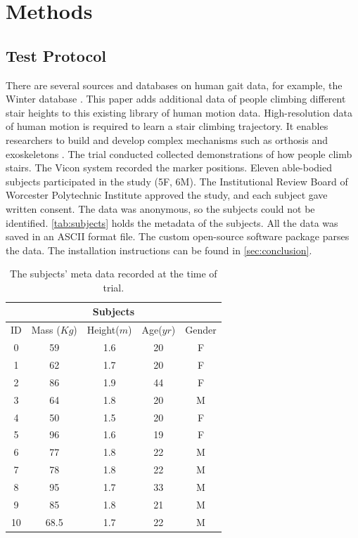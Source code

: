 \section{Methods} 

\subsection{Test Protocol} 

There are several sources and databases on human gait data, for example, the Winter database \cite{winter1984kinematic}. This paper adds additional data of people climbing different stair heights to this existing library of human motion data. High-resolution data of human motion is required to learn a stair climbing trajectory. It enables researchers to build and develop complex mechanisms such as orthosis and exoskeletons \cite{moore2015elaborate}.  The trial conducted collected demonstrations of how people climb stairs. The Vicon system recorded the marker positions. Eleven able-bodied subjects participated in the study (5F, 6M). The Institutional Review Board of Worcester Polytechnic Institute approved the study, and each subject gave written consent. The data was anonymous, so the subjects could not be identified. \autoref{tab:subjects} holds the metadata of the subjects. All the data was saved in an ASCII format file. The custom open-source software package parses the data. The installation instructions can be found in \autoref{sec:conclusion}.

\begin{table}[h!]
\centering
 \begin{tabular}{|c c c c c|} 
 \hline 
 \multicolumn{5}{|c|}{Subjects} \\
 \hline
 ID & Mass ($Kg$) &  Height($m$)  & Age($yr$)  & Gender \\ [0.5ex] 
 \hline\hline
 0 & 59 & 1.6 & 20 & F \\
 \hline
 1 & 62 & 1.7 & 20 & F \\ 
 \hline
 2 & 86 & 1.9 & 44 & F \\
 \hline
 3 & 64 & 1.8 & 20 & M \\ 
 \hline
 4 & 50 & 1.5 & 20 & F \\
 \hline
 5 & 96 & 1.6 &  19 & F\\
 \hline
 6 & 77 & 1.8 & 22 & M \\
 \hline
 7 & 78 & 1.8 & 22 & M \\
 \hline
 8 & 95 & 1.7 & 33 & M \\
 \hline
 9 & 85 & 1.8 & 21 & M \\
 \hline
 10 & 68.5 & 1.7 & 22 & M \\[1ex] 
 \hline
\end{tabular}
\caption{The subjects' meta data recorded at the time of trial.}
\label{tab:subjects}
\end{table}

